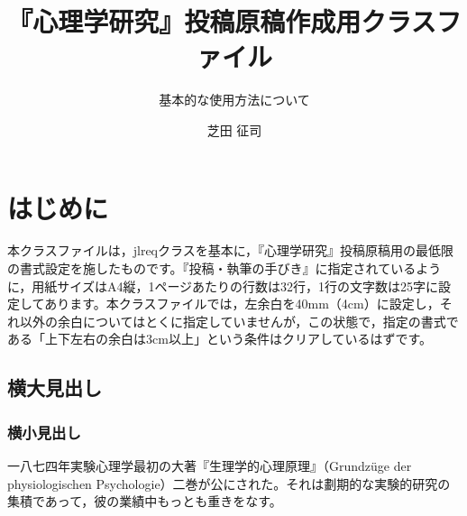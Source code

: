 \documentclass[jpcaption]{jjpsy}
\title{『心理学研究』投稿原稿作成用クラスファイル}{Class file for preparing a manuscript for submission to Journal of Psychological Research}
\subtitle{基本的な使用方法について}{Basic instructions}
\author{芝田 征司}
\begin{document}
\linenumbers %
\maketitle
\section{はじめに}

本クラスファイルは，jlreqクラスを基本に，『心理学研究』投稿原稿用の最低限の書式設定を施したものです。『投稿・執筆の手びき』に指定されているように，用紙サイズはA4縦，1ページあたりの行数は32行，1行の文字数は25字に設定してあります。本クラスファイルでは，左余白を40mm（4cm）に設定し，それ以外の余白についてはとくに指定していませんが，この状態で，指定の書式である「上下左右の余白は3cm以上」という条件はクリアしているはずです。

\subsection{横大見出し}


\subsubsection{横小見出し}

一八七四年実験心理学最初の大著『生理学的心理原理』（Grundzüge der physiologischen Psychologie）二巻が公にされた。それは劃期的な実験的研究の集積であって，彼の業績中もっとも重きをなす。

\noteshere
\end{document}
